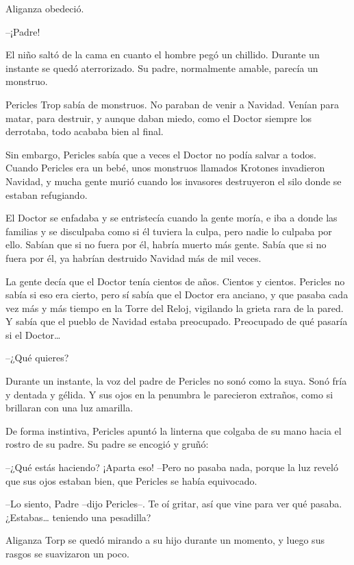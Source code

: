 Aliganza obedeció.

\mbox{}

\centerline{ \Huge *}

\mbox{}


--¡Padre!

El niño saltó de la cama en cuanto el hombre pegó un chillido. Durante un instante se quedó aterrorizado. Su padre, normalmente amable, parecía un monstruo.

Pericles Trop sabía de monstruos. No paraban de venir a Navidad. Venían para matar, para destruir, y aunque daban miedo, como el Doctor siempre los derrotaba, todo acababa bien al final.

Sin embargo, Pericles sabía que a veces el Doctor no podía salvar a todos. Cuando Pericles era un bebé, unos monstruos llamados Krotones invadieron Navidad, y mucha gente murió cuando los invasores destruyeron el silo donde se estaban refugiando.

El Doctor se enfadaba y se entristecía cuando la gente moría, e iba a donde las familias y se disculpaba como si él tuviera la culpa, pero nadie lo culpaba por ello. Sabían que si no fuera por él, habría muerto más gente. Sabía que si no fuera por él, ya habrían destruido Navidad más de mil veces.

La gente decía que el Doctor tenía cientos de años. Cientos y cientos. Pericles no sabía si eso era cierto, pero sí sabía que el Doctor era anciano, y que pasaba cada vez más y más tiempo en la Torre del Reloj, vigilando la grieta rara de la pared. Y sabía que el pueblo de Navidad estaba preocupado. Preocupado de qué pasaría si el Doctor…

--¿Qué quieres?

Durante un instante, la voz del padre de Pericles no sonó como la suya. Sonó fría y dentada y gélida. Y sus ojos en la penumbra le parecieron extraños, como si brillaran con una luz amarilla.

De forma instintiva, Pericles apuntó la linterna que colgaba de su mano hacia el rostro de su padre. Su padre se encogió y gruñó:

--¿Qué estás haciendo? ¡Aparta eso! --Pero no pasaba nada, porque la luz reveló que sus ojos estaban bien, que Pericles se había equivocado.

--Lo siento, Padre --dijo Pericles--. Te oí gritar, así que vine para ver qué pasaba. ¿Estabas… teniendo una pesadilla?

Aliganza Torp se quedó mirando a su hijo durante un momento, y luego sus rasgos se suavizaron un poco.


